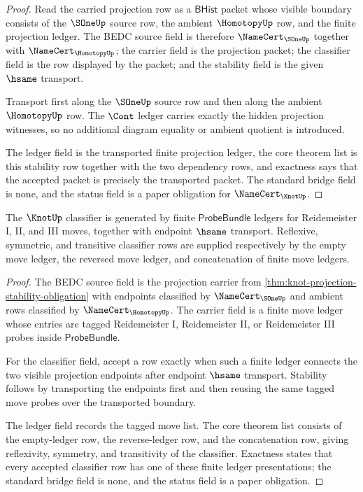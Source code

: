 \begin{proof}
Read the carried projection row as a $\mathsf{BHist}$ packet whose visible boundary consists of the $\SOneUp$ source row, the ambient $\HomotopyUp$ row, and the finite projection ledger. The BEDC source field is therefore $\NameCert_{\SOneUp}$ together with $\NameCert_{\HomotopyUp}$; the carrier field is the projection packet; the classifier field is the row displayed by the packet; and the stability field is the given $\hsame$ transport.

Transport first along the $\SOneUp$ source row and then along the ambient $\HomotopyUp$ row. The $\Cont$ ledger carries exactly the hidden projection witnesses, so no additional diagram equality or ambient quotient is introduced.

The ledger field is the transported finite projection ledger, the core theorem list is this stability row together with the two dependency rows, and exactness says that the accepted packet is precisely the transported packet. The standard bridge field is none, and the status field is a paper obligation for $\NameCert_{\KnotUp}$.
\end{proof}

\begin{theorem}\label{thm:knot-reidemeister-move-classifier-obligation}
The $\KnotUp$ classifier is generated by finite $\mathsf{ProbeBundle}$ ledgers for Reidemeister I, II, and III moves, together with endpoint $\hsame$ transport. Reflexive, symmetric, and transitive classifier rows are supplied respectively by the empty move ledger, the reversed move ledger, and concatenation of finite move ledgers.
\end{theorem}

\begin{proof}
The BEDC source field is the projection carrier from \autoref{thm:knot-projection-stability-obligation} with endpoints classified by $\NameCert_{\SOneUp}$ and ambient rows classified by $\NameCert_{\HomotopyUp}$. The carrier field is a finite move ledger whose entries are tagged Reidemeister I, Reidemeister II, or Reidemeister III probes inside $\mathsf{ProbeBundle}$.

For the classifier field, accept a row exactly when such a finite ledger connects the two visible projection endpoints after endpoint $\hsame$ transport. Stability follows by transporting the endpoints first and then reusing the same tagged move probes over the transported boundary.

The ledger field records the tagged move list. The core theorem list consists of the empty-ledger row, the reverse-ledger row, and the concatenation row, giving reflexivity, symmetry, and transitivity of the classifier. Exactness states that every accepted classifier row has one of these finite ledger presentations; the standard bridge field is none, and the status field is a paper obligation.
\end{proof}

